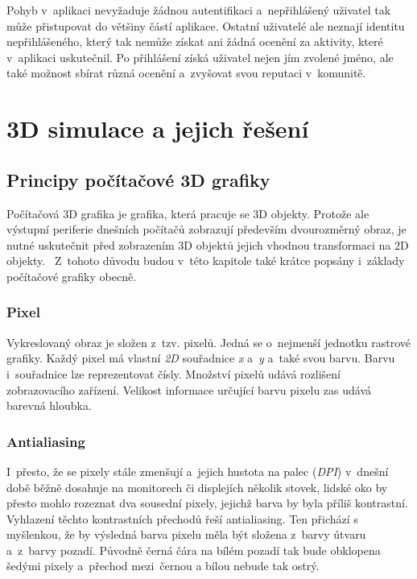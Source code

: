 \documentclass[a4paper,12pt]{article}
\begin{document}
Pohyb v~aplikaci nevyžaduje žádnou autentifikaci a~nepřihlášený uživatel tak může přistupovat do většiny částí aplikace. Ostatní uživatelé ale neznají identitu nepřihlášeného, který tak nemůže získat ani žádná ocenění za aktivity, které v~aplikaci uskutečnil. Po přihlášení získá uživatel nejen jím zvolené jméno, ale také možnost sbírat různá ocenění a~zvyšovat svou reputaci v~komunitě.



\section{3D simulace a jejich řešení}

\subsection{Principy počítačové 3D grafiky}

Počítačová 3D grafika je grafika, která pracuje se 3D objekty. Protože ale výstupní periferie dnešních počítačů zobrazují především dvourozměrný obraz, je nutné uskutečnit před zobrazením 3D objektů jejich vhodnou transformaci na 2D objekty.~\cite{graphic} Z~tohoto důvodu budou v~této kapitole také krátce popsány i~základy počítačové grafiky obecně.

\subsubsection{Pixel}

Vykreslovaný obraz je složen z~tzv. pixelů. Jedná se o~nejmenší jednotku rastrové grafiky. Každý pixel má vlastní \textit{2D} souřadnice \textit{x} a~\textit{y} a~také svou barvu. Barvu i~souřadnice lze reprezentovat čísly. Množství pixelů udává rozlišení zobrazovacího zařízení. Velikost informace určující barvu pixelu zas udává barevná hloubka.~\cite{graphic}

\subsubsection{Antialiasing}

I~přesto, že se pixely stále zmenšují a~jejich hustota na palec (\textit{DPI}) v~dnešní době běžně dosahuje na monitorech či displejích několik stovek, lidské oko by přesto mohlo rozeznat dva sousední pixely, jejichž barva by byla příliš kontrastní. Vyhlazení těchto kontrastních přechodů řeší antialiasing. Ten přichází s myšlenkou, že by výsledná barva pixelu měla být složena z~barvy útvaru a~z~barvy pozadí. Původně černá čára na bílém pozadí tak bude obklopena šedými pixely a~přechod mezi~černou a bílou nebude tak ostrý.~\cite{graphic}
\end{document}
